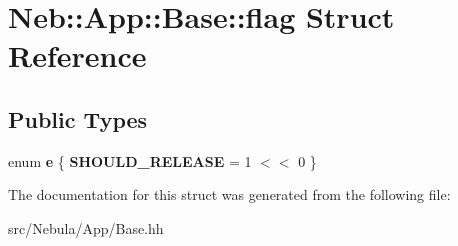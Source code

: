 \hypertarget{structNeb_1_1App_1_1Base_1_1flag}{\section{\-Neb\-:\-:\-App\-:\-:\-Base\-:\-:flag \-Struct \-Reference}
\label{structNeb_1_1App_1_1Base_1_1flag}
}
\subsection*{\-Public \-Types}
\begin{DoxyCompactItemize}
\item 
enum {\bfseries e} \{ {\bfseries \-S\-H\-O\-U\-L\-D\-\_\-\-R\-E\-L\-E\-A\-S\-E} =  1 $<$$<$ 0
 \}
\end{DoxyCompactItemize}


\-The documentation for this struct was generated from the following file\-:\begin{DoxyCompactItemize}
\item 
src/\-Nebula/\-App/\-Base.\-hh\end{DoxyCompactItemize}

